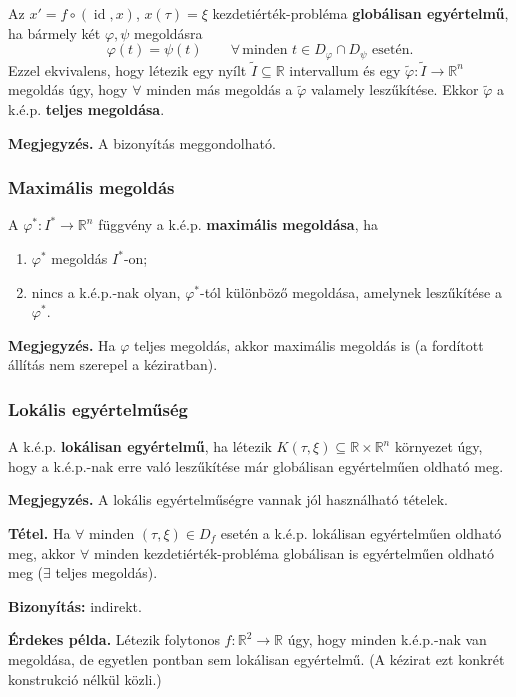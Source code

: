 Az $x'=f\circ(\operatorname{id},x)$, $x(\tau)=\xi$
kezdetiérték-probléma \textbf{globálisan egyértelmű}, ha
bármely két $\varphi,\psi$ megoldásra
\[
  \varphi(t)=\psi(t)\qquad
  \forall\,\text{minden }t\in D_\varphi\cap D_\psi\text{ esetén}.
\]
Ezzel ekvivalens, hogy létezik egy nyílt
$\widetilde I\subseteq\mathbb R$ intervallum és egy
$\widetilde\varphi:\widetilde I\to\mathbb R^n$ megoldás úgy,
hogy $\forall$ minden más megoldás a $\widetilde\varphi$ valamely leszűkítése.
Ekkor $\widetilde\varphi$ a k.é.p. \textbf{teljes megoldása}.

\noindent\textbf{Megjegyzés.} A bizonyítás meggondolható.

\subsubsection*{Maximális megoldás}

A $\varphi^*:I^*\to\mathbb R^n$ függvény a k.é.p.
\textbf{maximális megoldása}, ha
\begin{enumerate}
 \item $\varphi^*$ megoldás $I^*$-on;
 \item nincs a k.é.p.-nak olyan, $\varphi^*$-tól különböző megoldása,
       amelynek leszűkítése a $\varphi^*$.
\end{enumerate}

\noindent\textbf{Megjegyzés.} Ha $\varphi$ teljes megoldás,
akkor maximális megoldás is (a fordított állítás nem szerepel a kéziratban).

\subsubsection*{Lokális egyértelműség}

A k.é.p. \textbf{lokálisan egyértelmű}, ha létezik
$K(\tau,\xi)\subseteq\mathbb R\times\mathbb R^n$ környezet
úgy, hogy a k.é.p.-nak erre való leszűkítése már
globálisan egyértelműen oldható meg.

\noindent\textbf{Megjegyzés.} A lokális egyértelműségre vannak
jól használható tételek.

\noindent\textbf{Tétel.} Ha $\forall$ minden $(\tau,\xi)\in D_f$
esetén a k.é.p. lokálisan egyértelműen oldható meg,
akkor $\forall$ minden kezdetiérték-probléma globálisan is
egyértelműen oldható meg ($\exists$ teljes megoldás).

\noindent\textbf{Bizonyítás:} indirekt.

\noindent\textbf{Érdekes példa.} Létezik folytonos
$f:\mathbb R^2\to\mathbb R$ úgy, hogy minden k.é.p.-nak
van megoldása, de egyetlen pontban sem lokálisan egyértelmű.
(A kézirat ezt konkrét konstrukció nélkül közli.)

